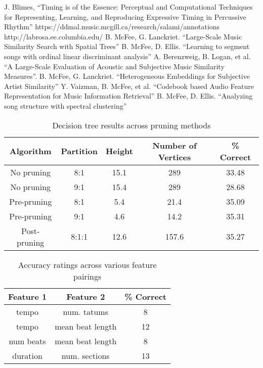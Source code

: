 \documentclass[11pt, twocolumn]{article}
\begin{document}
\begin{thebibliography}{9}
 J. Blimes, “Timing is of the Essence: Perceptual and Computational
Techniques for
      Representing, Learning, and Reproducing Expressive Timing in Percussive
Rhythm”
      https://ddmal.music.mcgill.ca/research/salami/annotations
      http://labrosa.ee.columbia.edu/
      B. McFee, G. Lanckriet. “Large-Scale Music Similarity Search with
Spatial Trees”
      B. McFee, D. Ellis. “Learning to segment songs with ordinal linear
discriminant analysis”
      A. Berenzweig, B. Logan, et al. “A Large-Scale Evaluation of Acoustic
and Subjective Music Similarity Measures”.
      B. McFee, G. Lanckriet. “Heterogeneous Embeddings for Subjective Artist
Similarity”
      Y. Vaizman, B. McFee, et al. “Codebook based Audio Feature
Representation for Music Information Retrieval”
      B. McFee, D. Ellis. “Analyzing song structure with spectral
clustering”
\end{thebibliography}

\begin{table}
  \begin{center}
    \begin{tabular}{ |c|c|c|c|c| }
      \hline
      Algorithm & Partition & Height & Number of Vertices & \% Correct \\
      \hline
      No pruning & 8:1 & 15.1 & 289 & 33.48 \\
      No pruning & 9:1 & 15.4 & 289 & 28.68 \\
      Pre-pruning & 8:1 & 5.4 & 21.4 & 35.09 \\
      Pre-pruning & 9:1 & 4.6 & 14.2 & 35.31 \\
      Post-pruning & 8:1:1 & 12.6 & 157.6 & 35.27 \\
      \hline
    \end{tabular}
  \end{center}
  \caption{Decision tree results across pruning methods}
\end{table}

\begin{table}
  \begin{center}
    \begin{tabular}{ |c|c|c| }
      \hline
      Feature 1 & Feature 2 & \% Correct \\
      \hline
      tempo & num. tatums & 8 \\
      tempo & mean beat length & 12 \\
      num beats & mean beat length & 8 \\
      duration & num. sections & 13 \\
      \hline
    \end{tabular}
  \end{center}
  \caption{Accuracy ratings across various feature pairings}
\end{table}
\end{document}
